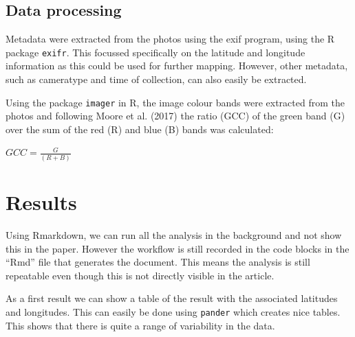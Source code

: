 \documentclass[]{elsarticle} %
\begin{document}
\subsection{Data processing}\label{data-processing}

Metadata were extracted from the photos using the exif program, using
the R package \texttt{exifr}. This focussed specifically on the latitude
and longitude information as this could be used for further mapping.
However, other metadata, such as cameratype and time of collection, can
also easily be extracted.

Using the package \texttt{imager} in R, the image colour bands were
extracted from the photos and following Moore et al. (2017) the ratio
(GCC) of the green band (G) over the sum of the red (R) and blue (B)
bands was calculated:

\(GCC = \frac{G}{(R + B)}\)

\section{Results}\label{results}

Using Rmarkdown, we can run all the analysis in the background and not
show this in the paper. However the workflow is still recorded in the
code blocks in the ``Rmd'' file that generates the document. This means
the analysis is still repeatable even though this is not directly
visible in the article.

As a first result we can show a table of the result with the associated
latitudes and longitudes. This can easily be done using \texttt{pander}
which creates nice tables. This shows that there is quite a range of
variability in the data.
\end{document}
